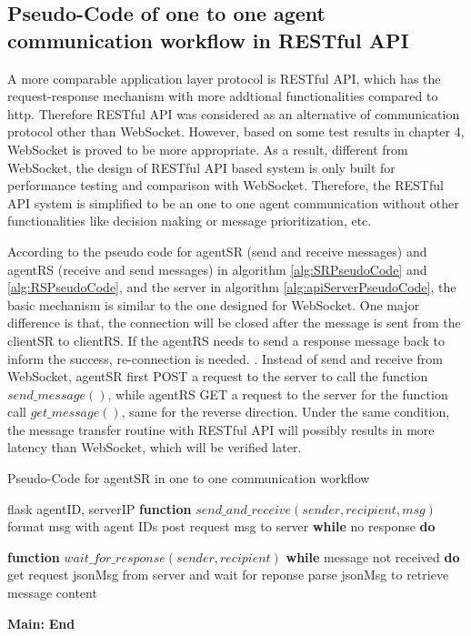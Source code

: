 \subsection{Pseudo-Code of one to one agent communication workflow in RESTful API}
A more comparable application layer protocol is RESTful API, which has the request-response mechanism with more addtional functionalities compared to \gls{http}. 
Therefore RESTful API was considered as an alternative of communication protocol other than WebSocket. 
However, based on some test results in chapter 4, WebSocket is proved to be more appropriate.
As a result, different from WebSocket, the design of RESTful API based system is only built for performance testing and comparison with WebSocket.
Therefore, the RESTful API system is simplified to be an one to one agent communication without other functionalities like decision making or message prioritization, etc.

According to the pseudo code for agentSR (send and receive messages) and agentRS (receive and send messages) in algorithm \ref{alg:SRPseudoCode} and \ref{alg:RSPseudoCode}, and the server in algorithm \ref{alg:apiServerPseudoCode}, 
the basic mechanism is similar to the one designed for WebSocket. One major difference is that, the connection will be closed after the message is sent from the clientSR to clientRS.
If the agentRS needs to send a response message back to inform the success, re-connection is needed. . 
Instead of send and receive from WebSocket, agentSR first POST a request to the server to call the function $send\_message()$, 
while agentRS GET a request to the server for the function call $get\_message()$, same for the reverse direction. 
Under the same condition, the message transfer routine with RESTful API will possibly results in more latency than WebSocket, which will be verified later.
  
\begin{algorithm}
    \caption{Pseudo-Code for agentSR in one to one communication workflow}
    \label{alg:SRPseudoCode}
    \begin{algorithmic}[1]
     flask
     agentID, serverIP
        \State \textbf{function} {$send\_and\_receive(sender, recipient, msg)$}
        \State \qquad format msg with agent IDs 
        \State \qquad post request msg to server
        \State \textbf{\qquad while} no response \textbf{do}    
        \State \qquad {}

        \State \textbf{function} {$wait\_for\_response(sender, recipient)$}
        \State \textbf{\qquad while} message not received \textbf{do}    
        \State \qquad \qquad get request jsonMsg from server and wait for reponse
        \State \qquad \qquad parse jsonMsg to retrieve message content
    

    \State \textbf{Main:}
    \State {}
    \State \textbf{End} 
    \end{algorithmic}
    \end{algorithm}


